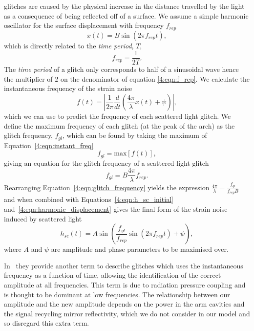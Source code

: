 \Scladj glitches are caused by the physical increase in the distance travelled by the light as a consequence of being reflected off of a surface. We assume a simple harmonic oscillator for the surface displacement with frequency $f_{rep}$
%
\begin{equation}
    x(t) = B \sin\left(2\pi f_{rep}t\right),
    \label{4:eqn:harmonic_displacement}
\end{equation}
%
which is directly related to the \emph{time period}, $T$,
%
\begin{equation}
  f_{rep} = \frac{1}{2 T}.
  \label{4:eqn:f_rep}
\end{equation}
%
The \emph{time period} of a \scladj glitch only corresponds to half of a sinusoidal wave hence the multiplier of 2 on the denominator of equation \ref{4:eqn:f_rep}. We calculate the instantaneous frequency of the strain noise~\cite{TAccadia:2010}
%
\begin{equation}
    f(t) = \left|\frac{1}{2\pi} \frac{d}{dt}\left(\frac{4\pi}{\lambda}x(t) + \psi\right)\right|,
    \label{4:eqn:instant_freq}
\end{equation}
%
which we can use to predict the frequency of each scattered light glitch. We define the maximum frequency of each glitch (at the peak of the arch) as the glitch frequency, $f_{gl}$, which can be found by taking the maximum of Equation~\ref{4:eqn:instant_freq}
%
\begin{equation}
    f_{gl} = \text{max}\left[f(t)\right],
\end{equation}
%
giving an equation for the glitch frequency of a scattered light glitch
%
\begin{equation}
    f_{gl} = B \frac{4\pi}{\lambda} f_{rep}.
    \label{4:eqn:glitch_frequency}
\end{equation}
%
Rearranging Equation~\ref{4:eqn:glitch_frequency} yields the expression $\frac{4\pi}{\lambda} = \frac{f_{gl}}{f_{rep} B}$ and when combined with Equations~\ref{4:eqn:h_sc_initial} and~\ref{4:eqn:harmonic_displacement} gives the final form of the strain noise induced by scattered light
%
\begin{equation}
  h_{sc}(t) = A \sin\left(\frac{f_{gl}}{f_{rep}} \sin(2 \pi f_{rep} t) + \psi\right),
  \label{4:eqn:model}
\end{equation}
%
where $A$ and $\psi$ are amplitude and phase parameters to be maximised over.

In~\cite{Was_Subtract:2021} they provide another term to describe \scladj glitches which uses the instantaneous frequency as a function of time, allowing the identification of the correct amplitude at all frequencies. This term is due to radiation pressure coupling and is thought to be dominant at low frequencies. The relationship between our amplitude and the new amplitude depends on the power in the arm cavities and the signal recycling mirror reflectivity, which we do not consider in our model and so disregard this extra term.

